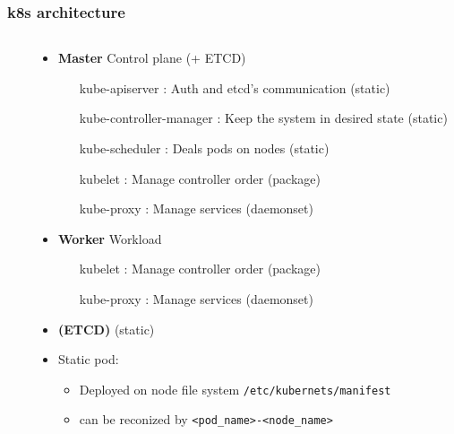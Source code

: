 \subsubsection{k8s architecture}
\begin{frame}[fragile]{\subsubsecname}
\begin{columns}
\begin{column}{0.2\textwidth}
\end{column}
\begin{column}{0.8\textwidth}
  \begin{itemize}
  \item \textbf{Master} Control plane (+ ETCD)
    \begin{itemize}
    \item[kube-apiserver]: Auth and etcd's communication (static)
    \item[kube-controller-manager]: Keep the system in desired state (static)
    \item[kube-scheduler]: Deals pods on nodes (static)
    \item[kubelet]: Manage controller order (package)
    \item[kube-proxy]: Manage services (daemonset)
    \end{itemize}
  \item \textbf{Worker} Workload
    \begin{itemize}
    \item[kubelet]: Manage controller order (package)
    \item[kube-proxy]: Manage services (daemonset)
    \end{itemize}
  \item \textbf{(ETCD)} (static)
  \end{itemize}
  \begin{itemize}
    \item Static pod:
    \begin{itemize}
      \item Deployed on node file system \texttt{/etc/kubernets/manifest}
      \item can be reconized by \texttt{<pod\_name>-<node\_name>}
    \end{itemize}
\end{itemize}
\end{column}
\end{columns}
\end{frame}
